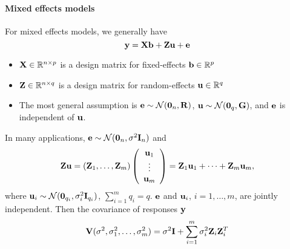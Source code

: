 \paragraph{Mixed effects models}
For mixed effects models, we generally have
$$
\mathbf{y} = \mathbf{X}\mathbf{b} + \mathbf{Z}\mathbf{u} + \mathbf{e}
$$
\begin{itemize}
	\item $\mathbf{X} \in \mathbb{R}^{n \times p}$ is a design matrix for fixed-effects $\mathbf{b} \in \mathbb{R}^p$
	\item $\mathbf{Z} \in \mathbb{R}^{n \times q}$ is a design matrix for random-effects $\mathbf{u} \in \mathbb{R}^q$
	\item The most general assumption is $\mathbf{e} \sim \mathcal{N}(\mathbf{0}_n, \mathbf{R})$, $\mathbf{u} \sim \mathcal{N}(\mathbf{0}_q, \mathbf{G})$, and $\mathbf{e}$ is independent of $\mathbf{u}$.
\end{itemize}
In many applications, $\mathbf{e} \sim \mathcal{N}(\mathbf{0}_n, \sigma^2 \mathbf{I}_n)$ and
$$
\mathbf{Zu} = \left( \mathbf{Z}_1, \dots, \mathbf{Z}_m \right) \left( \begin{array}{c}
	\mathbf{u}_1\\
	\vdots\\
	\mathbf{u}_m\\
\end{array}\right) = \mathbf{Z}_1 \mathbf{u}_1 + \dots + \mathbf{Z}_m \mathbf{u}_m,
$$
where $\mathbf{u}_i \sim \mathcal{N}(\mathbf{0}_{q_i}, \sigma^2_i \mathbf{I}_{q_i})$, $\sum_{i = 1}^m q_i = q$.
$\mathbf{e}$ and $\mathbf{u}_i$, $i = 1, \dots, m$, are jointly independent.
Then the covariance of responses $\mathbf{y}$
$$
\mathbf{V}(\sigma^2, \sigma_1^2, \dots, \sigma_m^2) = \sigma^2 \mathbf{I} + \sum\limits_{i = 1}^m \sigma_i^2 \mathbf{Z}_i \mathbf{Z}_i^T
$$


